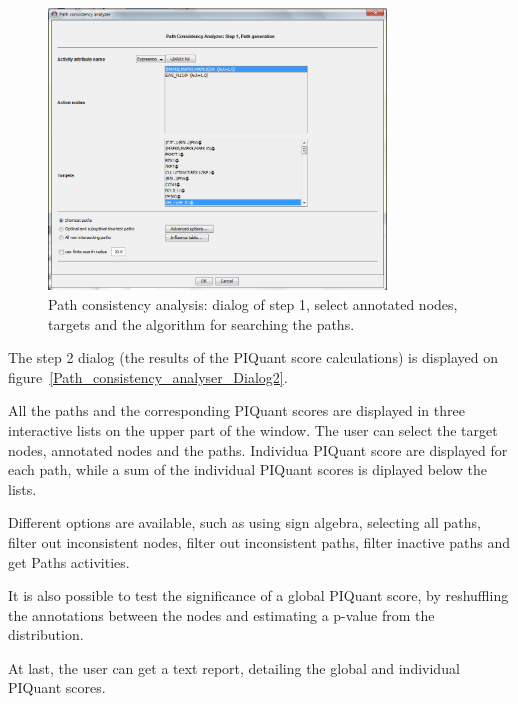 \begin{figure}
  \centering
  \includegraphics[width=0.8\textwidth]{graphics/Path_consistency_analyser_Dialog1}
  \caption{Path consistency analysis: dialog of step 1, select annotated nodes,
targets and the algorithm for searching the paths.}
  \label{Path_consistency_analyser_Dialog1}
\end{figure}

The step 2 dialog (the results of the PIQuant score calculations) is displayed on figure~\ref{Path_consistency_analyser_Dialog2}.

All the paths and the corresponding PIQuant scores are displayed in three
interactive lists on the upper part of the window. The user can select the
target nodes, annotated nodes and the paths. Individua PIQuant score are
displayed for each path, while a sum of the individual PIQuant scores is
diplayed below the lists.

Different options are available, such as using sign algebra, selecting all
paths, filter out inconsistent nodes, filter out inconsistent paths, filter
inactive paths and get Paths activities.

It is also possible to test the significance of a global PIQuant score, by
reshuffling the annotations between the nodes and estimating a p-value from the
distribution.

At last, the user can get a text report, detailing the global and individual
PIQuant scores.

